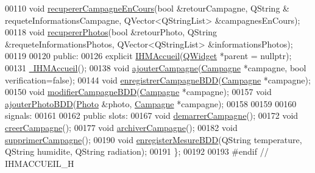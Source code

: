 \begin{DoxyCode}
00110     \textcolor{keywordtype}{void} \hyperlink{class_i_h_m_accueil_a0ffb0f0c7c9c613083933514690f2772}{recupererCampagneEnCours}(\textcolor{keywordtype}{bool} &retourCampagne, QString &
      requeteInformationsCampagne, QVector<QStringList> &campagnesEnCours);
00118     \textcolor{keywordtype}{void} \hyperlink{class_i_h_m_accueil_aebeef48b9bc345edd02e5185951c454e}{recupererPhotos}(\textcolor{keywordtype}{bool} &retourPhoto, QString &requeteInformationsPhotos, 
      QVector<QStringList> &informationsPhotos);
00119 
00120 \textcolor{keyword}{public}:
00126     \textcolor{keyword}{explicit} \hyperlink{class_i_h_m_accueil_a66cf4d5655e3132c1d313b76f3905e52}{IHMAccueil}(\hyperlink{class_q_widget}{QWidget} *parent = \textcolor{keyword}{nullptr});
00131     \hyperlink{class_i_h_m_accueil_a5ea3926747dada8b9677ab9a33c03139}{~IHMAccueil}();
00138     \textcolor{keywordtype}{void} \hyperlink{class_i_h_m_accueil_a3087ce7a78561c79ce3148761750dd1d}{ajouterCampagne}(\hyperlink{class_campagne}{Campagne} *campagne, \textcolor{keywordtype}{bool} verification=\textcolor{keyword}{false});
00144     \textcolor{keywordtype}{void} \hyperlink{class_i_h_m_accueil_a5ab04fc3fa87817bec130f377d563b75}{enregistrerCampagneBDD}(\hyperlink{class_campagne}{Campagne} *campagne);
00150     \textcolor{keywordtype}{void} \hyperlink{class_i_h_m_accueil_a7f1e5f71843a99cb44e3efb7191a6d07}{modifierCampagneBDD}(\hyperlink{class_campagne}{Campagne} *campagne);
00157     \textcolor{keywordtype}{void} \hyperlink{class_i_h_m_accueil_aa27c7334efe44c8c4cd582df6581fdff}{ajouterPhotoBDD}(\hyperlink{struct_photo}{Photo} &photo, \hyperlink{class_campagne}{Campagne} *campagne);
00158 
00159 
00160 signals:
00161 
00162 \textcolor{keyword}{public} slots:
00167     \textcolor{keywordtype}{void} \hyperlink{class_i_h_m_accueil_a6e8935ff4e0ba8f0c0015f370d91eda3}{demarrerCampagne}();
00172     \textcolor{keywordtype}{void} \hyperlink{class_i_h_m_accueil_a1da45b17d6e4198f87a9a0e05d1f7fd5}{creerCampagne}();
00177     \textcolor{keywordtype}{void} \hyperlink{class_i_h_m_accueil_a5d38917dbe88751ee966834e1f6c558e}{archiverCampagne}();
00182     \textcolor{keywordtype}{void} \hyperlink{class_i_h_m_accueil_a0d7c77277fe83ad13beee56d96c5c5ca}{supprimerCampagne}();
00190     \textcolor{keywordtype}{void} \hyperlink{class_i_h_m_accueil_af61976178829ec1fc756bec7eff0354d}{enregisterMesureBDD}(QString temperature, QString humidite, QString radiation);
00191 \};
00192 
00193 \textcolor{preprocessor}{#endif // IHMACCUEIL\_H}
\end{DoxyCode}
